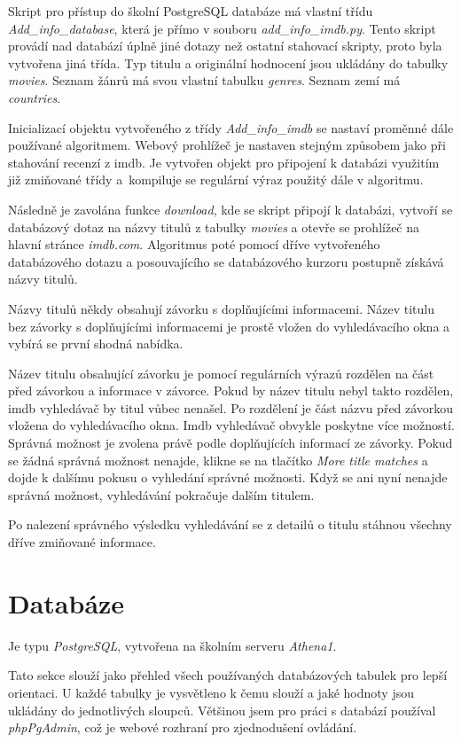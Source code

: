 Skript pro přístup do školní PostgreSQL databáze má vlastní třídu \emph{Add\_info\_database}, která je přímo v souboru \emph{add\_info\_imdb.py}. Tento skript provádí nad databází úplně jiné dotazy než ostatní stahovací skripty, proto byla vytvořena jiná třída. 
Typ titulu a originální hodnocení jsou ukládány do tabulky \emph{movies}. Seznam žánrů má svou vlastní tabulku \emph{genres}. Seznam zemí má \emph{countries}.

Inicializací objektu vytvořeného z třídy \emph{Add\_info\_imdb} se nastaví proměnné dále používané algoritmem. Webový prohlížeč je nastaven stejným způsobem jako při stahování recenzí z imdb. Je vytvořen objekt pro připojení k databázi využitím již zmiňované třídy a~kompiluje se regulární výraz použitý dále v algoritmu.

Následně je zavolána funkce \emph{download}, kde se skript připojí k databázi, vytvoří se databázový dotaz na názvy titulů z tabulky \emph{movies} a otevře se prohlížeč na hlavní stránce \emph{imdb.com}. Algoritmus poté pomocí dříve vytvořeného databázového dotazu a posouvajícího se databázového kurzoru postupně získává názvy titulů.

Názvy titulů někdy obsahují závorku s doplňujícími informacemi. Název titulu bez závorky s doplňujícími informacemi je prostě vložen do vyhledávacího okna a vybírá se první shodná nabídka.

Název titulu obsahující závorku je pomocí regulárních výrazů rozdělen na část před závorkou a informace v závorce. Pokud by název titulu nebyl takto rozdělen, imdb vyhledávač by titul vůbec nenašel. Po rozdělení je část názvu před závorkou vložena do vyhledávacího okna. Imdb vyhledávač obvykle poskytne více možností. Správná možnost je zvolena právě podle doplňujících informací ze závorky. Pokud se žádná správná možnost nenajde, klikne se na tlačítko \emph{More title matches} a dojde k dalšímu pokusu o vyhledání správné možnosti. Když se ani nyní nenajde správná možnost, vyhledávání pokračuje dalším titulem.

Po nalezení správného výsledku vyhledávání se z detailů o titulu stáhnou všechny dříve zmiňované informace.

\section{Databáze}
Je typu \emph{PostgreSQL}, vytvořena na školním serveru \emph{Athena1}.

Tato sekce slouží jako přehled všech používaných databázových tabulek pro lepší orientaci. U každé tabulky je vysvětleno k čemu slouží a jaké hodnoty jsou ukládány do jednotlivých sloupců. Většinou jsem pro práci s databází používal \emph{phpPgAdmin}, což je webové rozhraní pro zjednodušení ovládání. 



